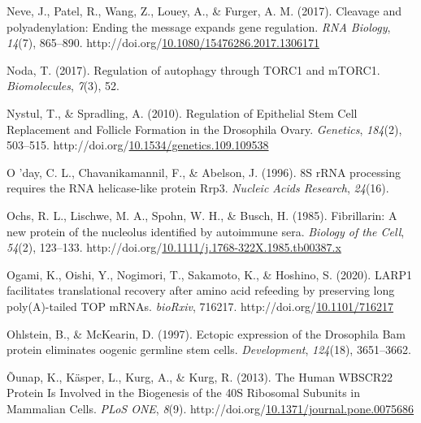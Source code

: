 \documentclass[12pt,oneside]{reedthesis}
\newlength{\cslhangindent}
\newenvironment{CSLReferences}[2] %
 {%
  \setlength{\parindent}{0pt}
  \ifodd #1 \everypar{\setlength{\hangindent}{\cslhangindent}}\ignorespaces\fi
  \ifnum #2 > 0
  \setlength{\parskip}{#2\baselineskip}
  \fi
 }%
 {}
\begin{document}
\begin{CSLReferences}{1}{0}
\leavevmode{}%
Neve, J., Patel, R., Wang, Z., Louey, A., \& Furger, A. M. (2017). Cleavage and polyadenylation: {Ending} the message expands gene regulation. \emph{RNA Biology}, \emph{14}(7), 865--890. http://doi.org/\href{https://doi.org/10.1080/15476286.2017.1306171}{10.1080/15476286.2017.1306171}

\leavevmode{}%
Noda, T. (2017). Regulation of autophagy through {TORC1} and {mTORC1}. \emph{Biomolecules}, \emph{7}(3), 52.

\leavevmode{}%
Nystul, T., \& Spradling, A. (2010). Regulation of {Epithelial Stem Cell Replacement} and {Follicle Formation} in the {Drosophila Ovary}. \emph{Genetics}, \emph{184}(2), 503--515. http://doi.org/\href{https://doi.org/10.1534/genetics.109.109538}{10.1534/genetics.109.109538}

\leavevmode{}%
O 'day, C. L., Chavanikamannil, F., \& Abelson, J. (1996). {8S rRNA} processing requires the {RNA} helicase-like protein {Rrp3}. \emph{Nucleic Acids Research}, \emph{24}(16).

\leavevmode{}%
Ochs, R. L., Lischwe, M. A., Spohn, W. H., \& Busch, H. (1985). Fibrillarin: A new protein of the nucleolus identified by autoimmune sera. \emph{Biology of the Cell}, \emph{54}(2), 123--133. http://doi.org/\href{https://doi.org/10.1111/j.1768-322X.1985.tb00387.x}{10.1111/j.1768-322X.1985.tb00387.x}

\leavevmode{}%
Ogami, K., Oishi, Y., Nogimori, T., Sakamoto, K., \& Hoshino, S. (2020). {LARP1} facilitates translational recovery after amino acid refeeding by preserving long poly({A})-tailed {TOP mRNAs}. \emph{bioRxiv}, 716217. http://doi.org/\href{https://doi.org/10.1101/716217}{10.1101/716217}

\leavevmode{}%
Ohlstein, B., \& McKearin, D. (1997). Ectopic expression of the {Drosophila Bam} protein eliminates oogenic germline stem cells. \emph{Development}, \emph{124}(18), 3651--3662.

\leavevmode{}%
Õunap, K., Käsper, L., Kurg, A., \& Kurg, R. (2013). The {Human WBSCR22 Protein Is Involved} in the {Biogenesis} of the {40S Ribosomal Subunits} in {Mammalian Cells}. \emph{PLoS ONE}, \emph{8}(9). http://doi.org/\href{https://doi.org/10.1371/journal.pone.0075686}{10.1371/journal.pone.0075686}


\end{CSLReferences}
\end{document}
